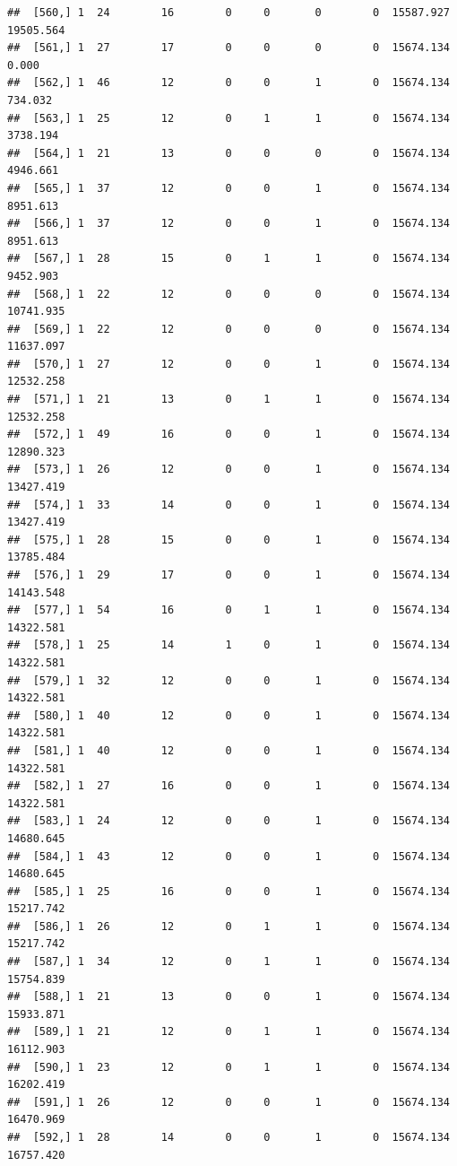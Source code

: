 \documentclass[
]{article}
\begin{document}
\begin{verbatim}
##  [560,] 1  24        16        0     0       0        0  15587.927  19505.564
##  [561,] 1  27        17        0     0       0        0  15674.134      0.000
##  [562,] 1  46        12        0     0       1        0  15674.134    734.032
##  [563,] 1  25        12        0     1       1        0  15674.134   3738.194
##  [564,] 1  21        13        0     0       0        0  15674.134   4946.661
##  [565,] 1  37        12        0     0       1        0  15674.134   8951.613
##  [566,] 1  37        12        0     0       1        0  15674.134   8951.613
##  [567,] 1  28        15        0     1       1        0  15674.134   9452.903
##  [568,] 1  22        12        0     0       0        0  15674.134  10741.935
##  [569,] 1  22        12        0     0       0        0  15674.134  11637.097
##  [570,] 1  27        12        0     0       1        0  15674.134  12532.258
##  [571,] 1  21        13        0     1       1        0  15674.134  12532.258
##  [572,] 1  49        16        0     0       1        0  15674.134  12890.323
##  [573,] 1  26        12        0     0       1        0  15674.134  13427.419
##  [574,] 1  33        14        0     0       1        0  15674.134  13427.419
##  [575,] 1  28        15        0     0       1        0  15674.134  13785.484
##  [576,] 1  29        17        0     0       1        0  15674.134  14143.548
##  [577,] 1  54        16        0     1       1        0  15674.134  14322.581
##  [578,] 1  25        14        1     0       1        0  15674.134  14322.581
##  [579,] 1  32        12        0     0       1        0  15674.134  14322.581
##  [580,] 1  40        12        0     0       1        0  15674.134  14322.581
##  [581,] 1  40        12        0     0       1        0  15674.134  14322.581
##  [582,] 1  27        16        0     0       1        0  15674.134  14322.581
##  [583,] 1  24        12        0     0       1        0  15674.134  14680.645
##  [584,] 1  43        12        0     0       1        0  15674.134  14680.645
##  [585,] 1  25        16        0     0       1        0  15674.134  15217.742
##  [586,] 1  26        12        0     1       1        0  15674.134  15217.742
##  [587,] 1  34        12        0     1       1        0  15674.134  15754.839
##  [588,] 1  21        13        0     0       1        0  15674.134  15933.871
##  [589,] 1  21        12        0     1       1        0  15674.134  16112.903
##  [590,] 1  23        12        0     1       1        0  15674.134  16202.419
##  [591,] 1  26        12        0     0       1        0  15674.134  16470.969
##  [592,] 1  28        14        0     0       1        0  15674.134  16757.420

\end{verbatim}
\end{document}
